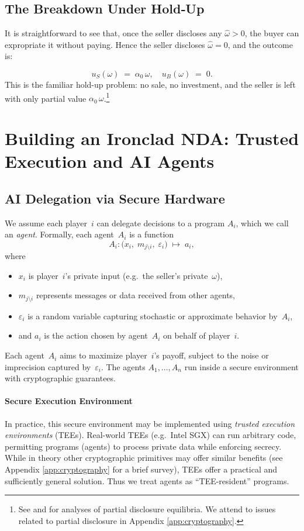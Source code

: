 \documentclass{article}
\begin{document}
\subsection{The Breakdown Under Hold‐Up}
\label{subsec:baseline-no-TEE}
It is straightforward to see that, once the seller discloses any $\hat\omega>0$, the buyer can expropriate it without paying. Hence the seller discloses $\hat\omega=0$, and the outcome is:

\[
  u_S(\omega) \;=\; \alpha_0\,\omega, 
  \quad
  u_B(\omega) \;=\; 0.
\]
This is the familiar hold-up problem: no sale, no investment, and the seller is left with
only partial value $\alpha_0\,\omega$.\footnote{See \citet{anton1994expropriation} and \citet{okuno1991incentive} for analyses of partial disclosure equilibria. We attend to issues related to partial disclosure in Appendix \ref{app:cryptography}.}

\section{Building an Ironclad NDA: Trusted Execution and AI Agents}
\label{sec:NDA}
\subsection{AI Delegation via Secure Hardware}
We assume each player~\(i\) can delegate decisions to a program
\(A_i\), which we call an \emph{agent}. Formally, each agent~\(A_i\) is a function
\[
  A_i \colon \bigl(x_i,\;m_{j\setminus i},\;\varepsilon_i\bigr)
  \;\longmapsto\;
  a_i,
\]
where
\begin{itemize}
  \item \(x_i\) is player~\(i\)'s private input (e.g.\ the seller's private~\(\omega\)),
  \item \(m_{j\setminus i}\) represents messages or data received from other agents,
  \item \(\varepsilon_i\) is a random variable capturing stochastic or approximate
    behavior by~\(A_i\),
  \item and \(a_i\) is the action chosen by agent~\(A_i\) on behalf of player~\(i\).
\end{itemize}
Each agent~\(A_i\) aims to maximize player~\(i\)'s payoff, subject to the noise
or imprecision captured by~\(\varepsilon_i\). The agents \(A_1,\dots,A_n\) run inside a secure environment with cryptographic guarantees. 

\paragraph{Secure Execution Environment}In practice, this secure environment may be implemented using \emph{trusted execution environments} (TEEs). Real-world TEEs (e.g.\ Intel SGX) can run arbitrary code, permitting programs (agents) to process private data while enforcing secrecy. While in theory other cryptographic primitives may offer similar benefits (see Appendix \ref{app:cryptography} for a brief survey), TEEs offer a practical and sufficiently general solution. Thus we treat agents as ``TEE-resident'' programs.
\end{document}
